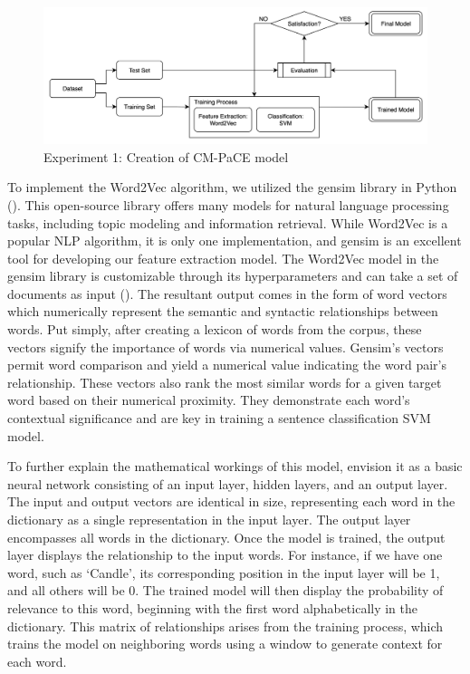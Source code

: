 \documentclass[english,bachelor]{swsLeipzig}
\begin{document}
\begin{figure}[h]
  \includegraphics[width=1\textwidth]{images/figure2.png}
  \caption{Experiment 1: Creation of CM-PaCE model}
  \label{fig:figure42}
\end{figure}

To implement the Word2Vec algorithm, we utilized the gensim library in Python (\citet{rehurek:2022}). This open-source library offers 
many models for natural language processing tasks, including topic modeling and information retrieval. While Word2Vec is a popular NLP algorithm, it is only one implementation, and gensim is an excellent tool for developing our feature extraction model. The Word2Vec model in the gensim library is customizable through its hyperparameters and can take a set of documents as input (\citet{rehurek:word2vec}). The resultant output comes in the form of word vectors which numerically represent the semantic and syntactic relationships between words. Put simply, after creating a lexicon of words from the corpus, these vectors signify the importance of words via numerical values. Gensim's vectors permit word comparison and yield a numerical value indicating the word pair's relationship. These vectors also rank the most similar words for a given target word based on their numerical proximity. They demonstrate each word's contextual significance and are key in training a sentence classification SVM model.

To further explain the mathematical workings of this model, envision it as a basic neural network consisting of an 
input layer, hidden layers, and an output layer.  The input and output vectors are identical in size, representing each word in the dictionary as a single representation in the input layer. The output layer encompasses all words in the dictionary. Once the model is trained, the output layer displays the relationship to the input words. For instance, if we have one word, such as `Candle', its corresponding position in the input layer will be 1, and all others will be 0. The trained model will then display the probability of relevance to this word, beginning with the first word alphabetically in the dictionary. This matrix of relationships arises from the training process, which trains the model on neighboring words using a window to generate context for each word.
\end{document}
